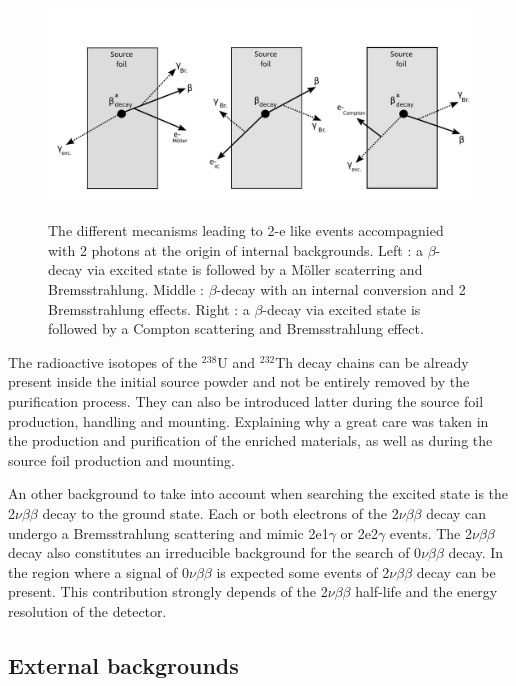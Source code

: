 \documentclass[main.tex]{subfiles}
\begin{document}
\begin{figure}[h!]
\centering
\includegraphics[scale=0.48]{pictures/Chap6/InternalBkg.pdf}
\label{InternalBkgPicture}
\caption{The different mecanisms leading to 2-e like events accompagnied with 2 photons at the origin of internal backgrounds. Left : a $\beta$-decay via excited state is followed by a M\"oller scaterring and Bremsstrahlung. Middle : $\beta$-decay with an internal conversion and 2 Bremsstrahlung effects. Right :  a $\beta$-decay via excited state is followed by a Compton scattering and Bremsstrahlung effect.}
\end{figure}


\bigskip


\NI The radioactive isotopes of the $^{\text{238}}$U and $^{\text{232}}$Th decay chains can be already present inside the initial source powder and not be entirely removed by the purification process. They can also be introduced latter during the source foil production, handling and mounting. Explaining why a great care was taken in the production and purification of the enriched materials, as well as during the source foil production and mounting.


\bigskip


\NI An other background to take into account when searching the excited state is the 2$\nu\beta\beta$ decay to the ground state. Each or both electrons of the 2$\nu\beta\beta$ decay can undergo a Bremsstrahlung scattering and mimic 2e1$\gamma$ or 2e2$\gamma$ events. The 2$\nu\beta\beta$ decay also constitutes an irreducible background for the search of 0$\nu\beta\beta$ decay. In the region where a signal of 0$\nu\beta\beta$ is expected some events of 2$\nu\beta\beta$ decay can be present. This contribution strongly depends of the 2$\nu\beta\beta$ half-life and the energy resolution of the detector.


\FloatBarrier


\subsection{External backgrounds}\label{sec:externalBkg}
\end{document}
